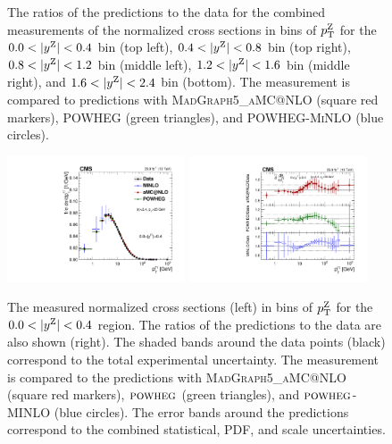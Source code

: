 \begin{figure}
	\caption{The ratios of the predictions to the data for the combined measurements of the normalized cross sections in bins of $p_{\mathrm{T}}^{\mathrm{Z}}$ for the 
	$0.0 < |y^{\mathrm{Z}}| < 0.4$ bin (top left), $0.4 < |y^{\mathrm{Z}}| < 0.8$ bin (top right),
	$0.8 < |y^{\mathrm{Z}}| < 1.2$ bin (middle left), $1.2 < |y^{\mathrm{Z}}| < 1.6$ bin (middle right), and $1.6 < |y^{\mathrm{Z}}| < 2.4$ bin (bottom). The measurement is compared to predictions with \textsc{MadGraph5\_aMC@NLO} (square red markers),  \textsc{POWHEG} (green triangles), and \textsc{POWHEG-MiNLO} (blue circles).}
	\label{fig:zll_double_norm}
\end{figure}


\begin{figure}
	\centering
	\includegraphics[width=0.47\textwidth]{figures/zpt/zll_double_normrap0.pdf}
        \includegraphics[width=0.47\textwidth]{figures/zpt/zll_double_ratio_normrap0.pdf}
	\caption{The measured normalized cross sections (left) in bins of $p_{\mathrm{T}}^{\mathrm{Z}}$ for the $0.0 < |y^{\mathrm{Z}}| < 0.4$ region. The ratios of the predictions to the data are also shown (right). The shaded bands around the data points (black) correspond to the total experimental uncertainty. The measurement is compared to the predictions with \textsc{MadGraph5\_aMC@NLO} (square red markers),  ${\textsc{powheg}}$ (green triangles), and ${\textsc{powheg}}$-\textsc{MINLO} (blue circles). The error bands around the predictions correspond to the combined statistical, PDF, and scale uncertainties.}
	\label{fig:zll_norm0}
\end{figure}



